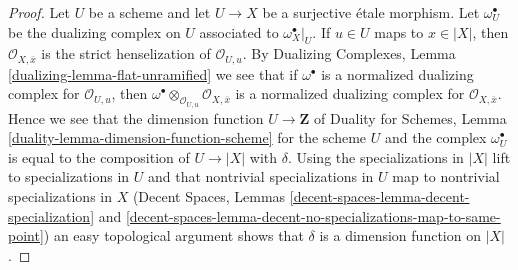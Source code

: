 \documentclass[10pt,a4paper]{amsart}
\theoremstyle{plain}
\theoremstyle{definition}
\theoremstyle{remark}
\numberwithin{equation}{subsection}
\begin{document}
\begin{proof}
Let $U$ be a scheme and let $U \to X$ be a surjective \'etale morphism.
Let $\omega_U^\bullet$ be the dualizing complex on $U$ associated
to $\omega_X^\bullet|_U$.
If $u \in U$ maps to $x \in |X|$, then $\mathcal{O}_{X, \overline{x}}$
is the strict henselization of $\mathcal{O}_{U, u}$. By
Dualizing Complexes, Lemma \ref{dualizing-lemma-flat-unramified}
we see that if $\omega^\bullet$ is a normalized dualizing complex
for $\mathcal{O}_{U, u}$, then
$\omega^\bullet \otimes_{\mathcal{O}_{U, u}} \mathcal{O}_{X, \overline{x}}$
is a normalized dualizing complex for $\mathcal{O}_{X, \overline{x}}$.
Hence we see that the dimension function $U \to \mathbf{Z}$ of
Duality for Schemes, Lemma \ref{duality-lemma-dimension-function-scheme}
for the scheme $U$ and the complex
$\omega_U^\bullet$ is equal to the composition of $U \to |X|$ with $\delta$.
Using the specializations in $|X|$ lift to specializations in $U$
and that nontrivial specializations in $U$ map to
nontrivial specializations in $X$
(Decent Spaces, Lemmas \ref{decent-spaces-lemma-decent-specialization} and
\ref{decent-spaces-lemma-decent-no-specializations-map-to-same-point})
an easy topological argument shows that $\delta$ is a dimension function
on $|X|$.
\end{proof}
\end{document}
